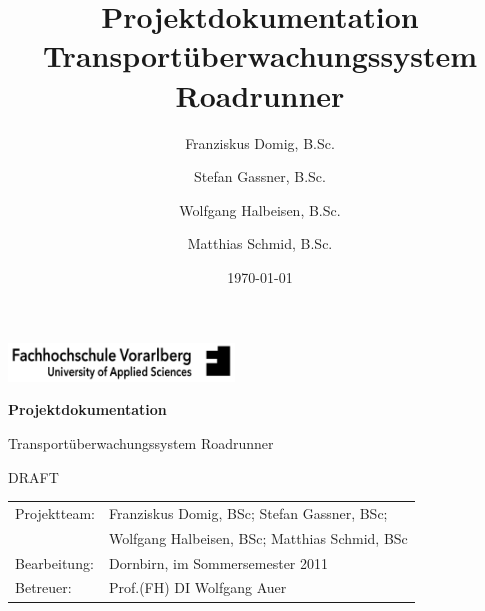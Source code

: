 \documentclass[11pt,a4paper]{article}
\title{
	Projektdokumentation\\
	Transportüberwachungssystem Roadrunner
}
\author{
	Franziskus Domig, B.Sc.\\
		\and
	Stefan Gassner, B.Sc.\\
		\and
	Wolfgang Halbeisen, B.Sc.\\
		\and
	Matthias Schmid, B.Sc.\\	
}
\date{\today}
\begin{document}
	

\pagestyle{empty} %

\begin{center}

\includegraphics[width=60mm]{files/logo-fhv.png}

\vspace{4cm}
{\large\textbf{Projektdokumentation}}\vspace{.5cm}

{\LARGE Transportüberwachungssystem Roadrunner}

\vspace{7cm}
{\LARGE DRAFT}

\end{center}

\vspace{5cm}


\begin{tabular}{ll}
	Projektteam: & Franziskus Domig, BSc; Stefan Gassner, BSc;\\
	     	& Wolfgang Halbeisen, BSc; Matthias Schmid, BSc\\
	Bearbeitung: & Dornbirn, im Sommersemester 2011\\
	Betreuer:    & Prof.(FH) DI Wolfgang Auer\\
\end{tabular}


\clearpage
\pagestyle{fancy}
\setcounter{page}{1}



\clearpage
\tableofcontents

\clearpage
{}
\setcounter{page}{1}

\fancyfoot[CO]{\thepage}



\clearpage


\clearpage


\clearpage


\clearpage

\end{document}

